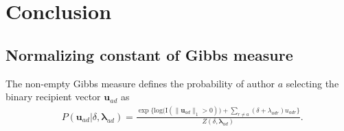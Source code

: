 \documentclass[12pt]{article}
\begin{document}
\section{Conclusion}\label{sec:conclusion}
\newpage


\begin{appendices}
\section{Normalizing constant of Gibbs measure}\label{sec: non-empty Gibbs measure}
The non-empty Gibbs measure \cite{fellows2017removing} defines the probability of author $a$ selecting the binary recipient vector $\boldsymbol{u}_{ad}$ as
\begin{equation*} 
\begin{aligned}
& P(\boldsymbol{u}_{ad}| \delta, \boldsymbol{\lambda}_{ad} ) = \frac{\exp\Big\{ \mbox{log}\big(\text{I}(\lVert \boldsymbol{u}_{ad} \rVert_1 > 0)\big) + \sum_{r \neq a} (\delta+\lambda_{adr})u_{adr} \Big\}}{Z(\delta,\boldsymbol{\lambda}_{ad})}.
\end{aligned}
\end{equation*}


\end{appendices}
\end{document}

